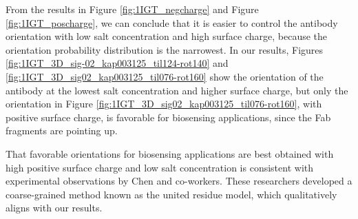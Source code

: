 From the results in Figure \ref{fig:1IGT_negcharge} and Figure \ref{fig:1IGT_poscharge}, we can conclude that it is easier to control the antibody orientation with low salt concentration and high surface charge, because the orientation probability distribution is the narrowest. In our results, Figures \ref{fig:1IGT_3D_sig-02_kap003125_til124-rot140} and \ref{fig:1IGT_3D_sig02_kap003125_til076-rot160} show the orientation of the antibody at the lowest salt concentration and higher surface charge, but only the orientation in Figure \ref{fig:1IGT_3D_sig02_kap003125_til076-rot160}, with positive surface charge, is favorable for biosensing applications, since the Fab fragments are pointing up.

That favorable orientations for biosensing applications are best obtained with high positive surface charge and low salt concentration is consistent with experimental observations by Chen and co-workers. \cite{ChenLiuZhouJiang2003} These researchers developed a coarse-grained method known as the united residue model,\cite{ZhouChenJiang2003} which qualitatively aligns with our results.
 